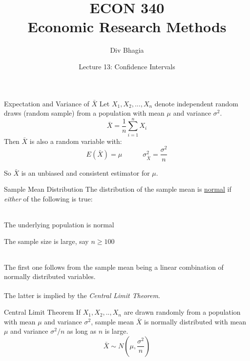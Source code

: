 \documentclass{./../div_teaching_slides}
\begin{document}
\title{ECON 340 \\ Economic Research Methods}
\author{Div Bhagia}
\date{Lecture 13: Confidence Intervals}

\begin{frame}
\maketitle
\end{frame}


\begin{frame}{Expectation and Variance of $\bar{X}$}
Let $X_1,X_2,...,X_n$ denote independent random draws (random sample) from a population with mean $\mu$ and variance $\sigma^2$. 
$$ \bar{X} = \frac{1}{n} \sum_{i=1}^n X_i $$
Then $\bar{X}$ is also a random variable with:
$$E(\bar{X}) = \mu \quad \quad \quad  \sigma^2_{\bar{X}}= \frac{\sigma^2}{n} $$ 

So $\bar{X}$ is an unbiased and consistent estimator for $\mu$.
\end{frame}

\begin{frame}{Sample Mean Distribution}
The distribution of the sample mean is \underline{normal} if \textit{either} of the following is true: \\~\\
\begin{witemize}
  \item The underlying population is normal
  \item The sample size is large, say $n\geq 100$ \\~\\
\end{witemize}
The first one follows from the sample mean being a linear combination of normally distributed variables. \\~\\

The latter is implied by the \textit{Central Limit Theorem}. 
\end{frame}

\begin{frame}{Central Limit Theorem}
\vspace{2em}
If $X_1, X_2,..,X_n$ are drawn randomly from a population with mean $\mu$ and variance $\sigma^2$, sample mean $\bar{X}$ is normally distributed with mean $\mu$ and variance $\sigma^2/n$ as long as $n$ is large.
$$\bar{X} \sim N\left(\mu, \dfrac{\sigma^2}{n}\right)$$ \\~\\
\href{https://dbhagia.shinyapps.io/CLT-Demo/}{}
\end{frame}
\end{document}
